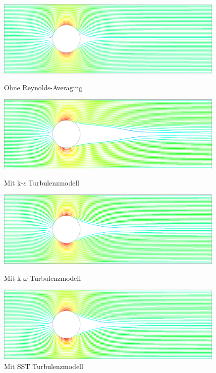 \begin{refsection}
\begin{figure}
  \centering
  \includegraphics[width=0.99\textwidth]{papers/reynolds/croppedimages/dns.png}
  \caption{Ohne Reynolds-Averaging}
  \label{fig:ohne}
  \centering
  \includegraphics[width=0.99\textwidth]{papers/reynolds/croppedimages/k-e.png}
  \caption{Mit k-$\epsilon$ Turbulenzmodell}
  \label{fig:k-e}
  \centering
  \includegraphics[width=0.99\textwidth]{papers/reynolds/croppedimages/k-w.png}
  \caption{Mit k-$\omega$ Turbulenzmodell}
  \label{fig:k-w}
  \centering
  \includegraphics[width=0.99\textwidth]{papers/reynolds/croppedimages/sst.png}
  \caption{Mit SST Turbulenzmodell}
  \label{fig:SST}
\end{figure}


\end{refsection}
